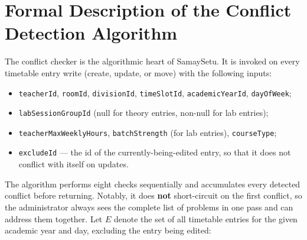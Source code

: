 \section{Formal Description of the Conflict Detection Algorithm}

The conflict checker is the algorithmic heart of SamaySetu. It is invoked on every timetable entry write (create, update, or move) with the following inputs:

\begin{itemize}
    \item \texttt{teacherId}, \texttt{roomId}, \texttt{divisionId}, \texttt{timeSlotId}, \texttt{academicYearId}, \texttt{dayOfWeek};
    \item \texttt{labSessionGroupId} (null for theory entries, non-null for lab entries);
    \item \texttt{teacherMaxWeeklyHours}, \texttt{batchStrength} (for lab entries), \texttt{courseType};
    \item \texttt{excludeId} --- the id of the currently-being-edited entry, so that it does not conflict with itself on updates.
\end{itemize}

The algorithm performs eight checks sequentially and accumulates every detected conflict before returning. Notably, it does \textbf{not} short-circuit on the first conflict, so the administrator always sees the complete list of problems in one pass and can address them together. Let $E$ denote the set of all timetable entries for the given academic year and day, excluding the entry being edited:

